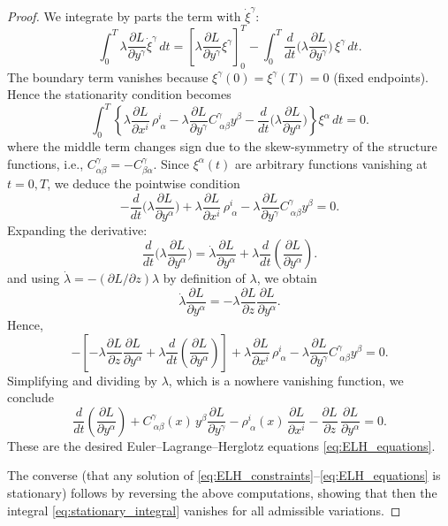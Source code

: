 \documentclass[11pt,a4paper]{article}
\theoremstyle{definition}
\begin{document}
\begin{proof}
We integrate by parts the term with $\dot \xi^\gamma$:
\[
\int_0^T \lambda \frac{\partial L}{\partial y^\gamma} \dot \xi^\gamma\, dt
= \left[ \lambda \frac{\partial L}{\partial y^\gamma} \xi^\gamma \right]_0^T
- \int_0^T \frac{d}{dt}\Big(\lambda \frac{\partial L}{\partial y^\gamma}\Big)
\,\xi^\gamma \,dt.
\]
The boundary term vanishes because $\xi^{\gamma}(0)=\xi^{\gamma}(T)=0$ (fixed endpoints).
Hence the stationarity condition becomes
\[
\int_0^T \left\{
\lambda \frac{\partial L}{\partial x^i}\,\rho^i_{\ \alpha}
- \lambda \frac{\partial L}{\partial y^\gamma} C^\gamma_{\ \alpha\beta}y^\beta
- \frac{d}{dt}\Big(\lambda \frac{\partial L}{\partial y^\alpha}\Big)
\right\} \xi^\alpha \, dt = 0.
\]
where the middle term changes sign due to the skew-symmetry of the structure functions, i.e., $C_{\alpha \beta}^{\gamma}=-C_{\beta \alpha}^{\gamma}$. Since $\xi^\alpha(t)$ are arbitrary functions vanishing at $t=0,T$,
we deduce the pointwise condition
\[
- \frac{d}{dt}\Big(\lambda \frac{\partial L}{\partial y^\alpha}\Big)
+ \lambda \frac{\partial L}{\partial x^i}\,\rho^i_{\ \alpha}
- \lambda \frac{\partial L}{\partial y^\gamma} C^\gamma_{\ \alpha\beta}y^\beta
= 0.
\]
Expanding the derivative:
\[
\frac{d}{dt}\Big(\lambda \frac{\partial L}{\partial y^\alpha}\Big)
= \dot \lambda \frac{\partial L}{\partial y^\alpha}
+ \lambda \frac{d}{dt}\left( \frac{\partial L}{\partial y^\alpha}\right).
\]
and using $\dot\lambda = -(\partial L/\partial z)\lambda$ by definition of $\lambda$,
we obtain
\[
\dot \lambda \frac{\partial L}{\partial y^\alpha}
= -\lambda \frac{\partial L}{\partial z}\frac{\partial L}{\partial y^\alpha}.
\]
Hence,
\[
- \left[
-\lambda \frac{\partial L}{\partial z}\frac{\partial L}{\partial y^\alpha}
+ \lambda \frac{d}{dt}\left( \frac{\partial L}{\partial y^\alpha}\right)
\right]
+ \lambda \frac{\partial L}{\partial x^i}\,\rho^i_{\ \alpha}
- \lambda \frac{\partial L}{\partial y^\gamma} C^\gamma_{\ \alpha\beta}y^\beta
= 0.
\]
Simplifying and dividing by $\lambda$, which is a nowhere vanishing function, we conclude
\[
\frac{d}{dt}\left(\frac{\partial L}{\partial y^\alpha}\right)
+ C^\gamma_{\ \alpha\beta}(x)\,y^\beta \frac{\partial L}{\partial y^\gamma}
- \rho^i_{\ \alpha}(x)\,\frac{\partial L}{\partial x^i}
- \frac{\partial L}{\partial z}\,\frac{\partial L}{\partial y^\alpha}
= 0.
\]
These are the desired Euler--Lagrange--Herglotz equations \eqref{eq:ELH_equations}.

The converse (that any solution of \eqref{eq:ELH_constraints}--\eqref{eq:ELH_equations}
is stationary) follows by reversing the above computations, showing that then
the integral \eqref{eq:stationary_integral} vanishes for all admissible
variations.
\end{proof}
\end{document}
